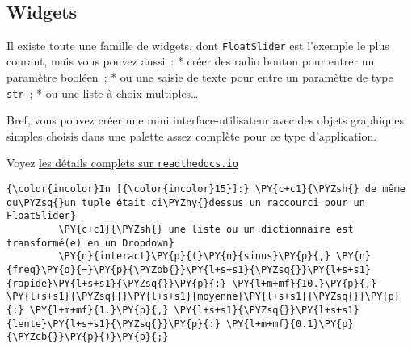     \begin{center}
    \end{center}
    { \hspace*{\fill} \\}
    
    \hypertarget{widgets}{%
\subsection{Widgets}\label{widgets}}

    Il existe toute une famille de widgets, dont \texttt{FloatSlider} est
l'exemple le plus courant, mais vous pouvez aussi~: * créer des radio
bouton pour entrer un paramètre booléen~; * ou une saisie de texte pour
entre un paramètre de type \texttt{str}~; * ou une liste à choix
multiples\ldots{}

Bref, vous pouvez créer une mini interface-utilisateur avec des objets
graphiques simples choisis dans une palette assez complète pour ce type
d'application.

Voyez
\href{http://ipywidgets.readthedocs.io/en/latest/examples/Using\%20Interact.html}{les
détails complets sur \texttt{readthedocs.io}}

    \begin{Verbatim}[commandchars=\\\{\}]
{\color{incolor}In [{\color{incolor}15}]:} \PY{c+c1}{\PYZsh{} de même qu\PYZsq{}un tuple était ci\PYZhy{}dessus un raccourci pour un FloatSlider}
         \PY{c+c1}{\PYZsh{} une liste ou un dictionnaire est transformé(e) en un Dropdown}
         \PY{n}{interact}\PY{p}{(}\PY{n}{sinus}\PY{p}{,} \PY{n}{freq}\PY{o}{=}\PY{p}{\PYZob{}}\PY{l+s+s1}{\PYZsq{}}\PY{l+s+s1}{rapide}\PY{l+s+s1}{\PYZsq{}}\PY{p}{:} \PY{l+m+mf}{10.}\PY{p}{,} \PY{l+s+s1}{\PYZsq{}}\PY{l+s+s1}{moyenne}\PY{l+s+s1}{\PYZsq{}}\PY{p}{:} \PY{l+m+mf}{1.}\PY{p}{,} \PY{l+s+s1}{\PYZsq{}}\PY{l+s+s1}{lente}\PY{l+s+s1}{\PYZsq{}}\PY{p}{:} \PY{l+m+mf}{0.1}\PY{p}{\PYZcb{}}\PY{p}{)}\PY{p}{;}
\end{Verbatim}


    \begin{center}
    \end{center}
    { \hspace*{\fill} \\}
    
